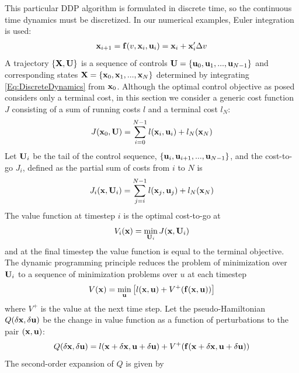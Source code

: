 This particular DDP algorithm is formulated in discrete time, so the continuous time dynamics must be discretized. In our numerical examples, Euler integration is used:
\begin{align}
	\mathbf{x}_{i+1} = \mathbf{f}(v, \mathbf{x}_i,\mathbf{u}_i) = \mathbf{x}_i + \mathbf{x}_i'\Delta v \label{Eq:DiscreteDynamics}
\end{align}
A trajectory $\{\mathbf{X},\mathbf{U}\}$ is a sequence of controls $ \mathbf{U}=\{\mathbf{u}_0,\mathbf{u}_1,...,\mathbf{u}_{N-1}\} $ and corresponding states $\mathbf{X}=\{\mathbf{x}_0,\mathbf{x}_1,...,\mathbf{x}_N\}$ determined by integrating \eqref{Eq:DiscreteDynamics} from $\mathbf{x}_0$.
Although the optimal control objective as posed considers only a terminal cost, in this section we consider a generic cost function $J$ consisting of a sum of running costs $l$ and a terminal cost $l_N$:
\begin{align}
	J(\mathbf{x}_0,\mathbf{U}) = \sum_{i=0}^{N-1}l(\mathbf{x}_i,\mathbf{u}_i) + l_N(\mathbf{x}_N)
\end{align}
Let $\mathbf{U}_i$ be the tail of the control sequence, $\{\mathbf{u}_i,\mathbf{u}_{i+1},...,\mathbf{u}_{N-1}\}$, and the cost-to-go $J_i$, defined as the partial sum of costs from $i$ to $N$ is
\begin{align}
	J_i(\mathbf{x},\mathbf{U}_i) = \sum_{j=i}^{N-1}l(\mathbf{x}_j,\mathbf{u}_j) + l_N(\mathbf{x}_N)
\end{align}
The value function at timestep $i$ is the optimal cost-to-go at \state
\begin{align}
	V_i(\mathbf{x}) = \min_{\mathbf{U}_i} J(\mathbf{x}, \mathbf{U}_i)
\end{align}
and at the final timestep the value function is equal to the terminal objective. The dynamic programming principle reduces the problem of minimization over $\mathbf{U}_i$ to a sequence of minimization problems over $u$ at each timestep 
\begin{align}
	V(\mathbf{x}) = \min_{\mathbf{u}}\left[l(\mathbf{x},\mathbf{u}) + V^+(\mathbf{f}(\mathbf{x},\mathbf{u}))\right] \label{eq_dynamic_programming}
\end{align}
where $V^+$ is the value at the next time step.
Let the pseudo-Hamiltonian $Q(\delta\mathbf{x},\delta\mathbf{u})$ be the change in value function as a function of perturbations to the pair $(\mathbf{x},\mathbf{u})$:
\begin{align}
	Q(\delta\mathbf{x},\delta\mathbf{u}) = l(\mathbf{x}+\delta\mathbf{x},\mathbf{u}+\delta\mathbf{u}) + V^+(\mathbf{f}(\mathbf{x}+\delta\mathbf{x},\mathbf{u}+\delta\mathbf{u}))
\end{align}
The second-order expansion of $ Q $ is given by
